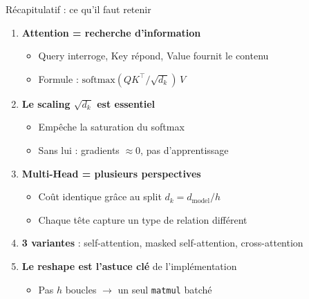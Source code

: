 \documentclass[aspectratio=169, 11pt]{beamer}
\begin{document}
\begin{frame}{Récapitulatif : ce qu'il faut retenir}
\begin{enumerate}
    \item \textbf{Attention = recherche d'information}
    \begin{itemize}
        \item Query interroge, Key répond, Value fournit le contenu
        \item Formule : $\text{softmax}(QK^\top / \sqrt{d_k}) \, V$
    \end{itemize}
    
    \vspace{0.3em}
    \item \textbf{Le scaling $\sqrt{d_k}$ est essentiel}
    \begin{itemize}
        \item Empêche la saturation du softmax
        \item Sans lui : gradients $\approx 0$, pas d'apprentissage
    \end{itemize}
    
    \vspace{0.3em}
    \item \textbf{Multi-Head = plusieurs perspectives}
    \begin{itemize}
        \item Coût identique grâce au split $d_k = d_{\text{model}} / h$
        \item Chaque tête capture un type de relation différent
    \end{itemize}
    
    \vspace{0.3em}
    \item \textbf{3 variantes} : self-attention, masked self-attention, cross-attention
    
    \vspace{0.3em}
    \item \textbf{Le reshape est l'astuce clé} de l'implémentation
    \begin{itemize}
        \item Pas $h$ boucles $\rightarrow$ un seul \texttt{matmul} batché
    \end{itemize}
\end{enumerate}
\end{frame}
\end{document}
